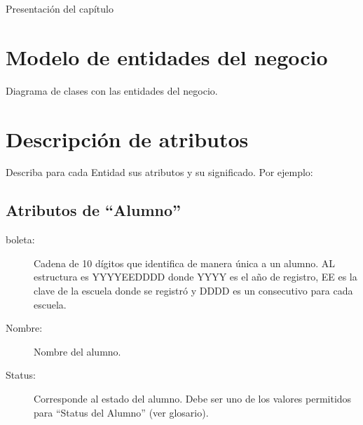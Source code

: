 Presentación del capítulo

\section{Modelo de entidades del negocio}

Diagrama de clases con las entidades del negocio.


\section{Descripción de atributos}

Describa para cada Entidad sus atributos y su significado. Por ejemplo:

\subsection{Atributos de ``Alumno''}

\begin{description}
	\item[boleta: ] Cadena de 10 dígitos que identifica de manera única a un alumno. AL estructura es YYYYEEDDDD  donde YYYY es el año de registro, EE es la clave de la escuela donde se registró y DDDD es un consecutivo para cada escuela.
	\item[Nombre: ] Nombre del alumno.
	\item[Status: ] Corresponde al estado del alumno. Debe ser uno de los valores permitidos para ``Status del Alumno'' (ver glosario).
\end{description}

